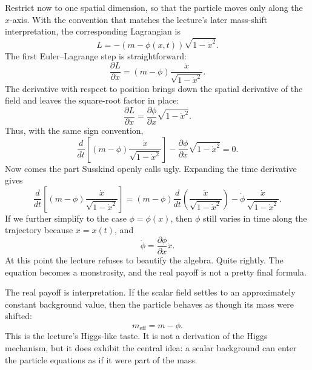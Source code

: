 Restrict now to one spatial dimension, so that the particle moves only along the \(x\)-axis. With the convention that matches the lecture's later mass-shift interpretation, the corresponding Lagrangian is
\begin{equation}
L=-(m-\phi(x,t))\sqrt{1-\dot x^2}.
\end{equation}
The first Euler--Lagrange step is straightforward:
\begin{equation}
\frac{\partial L}{\partial \dot x}
=
(m-\phi)\frac{\dot x}{\sqrt{1-\dot x^2}}.
\end{equation}
The derivative with respect to position brings down the spatial derivative of the field and leaves the square-root factor in place:
\begin{equation}
\frac{\partial L}{\partial x}
=
\frac{\partial\phi}{\partial x}\sqrt{1-\dot x^2}.
\end{equation}
Thus, with the same sign convention,
\begin{equation}
\frac{d}{dt}
\left[
(m-\phi)\frac{\dot x}{\sqrt{1-\dot x^2}}
\right]
-
\frac{\partial\phi}{\partial x}\sqrt{1-\dot x^2}
=0.
\end{equation}
Now comes the part Susskind openly calls ugly. Expanding the time derivative gives
\begin{equation}
\frac{d}{dt}
\left[
(m-\phi)\frac{\dot x}{\sqrt{1-\dot x^2}}
\right]
=
(m-\phi)\frac{d}{dt}\left(\frac{\dot x}{\sqrt{1-\dot x^2}}\right)
-
\dot\phi\,\frac{\dot x}{\sqrt{1-\dot x^2}}.
\end{equation}
If we further simplify to the case \(\phi=\phi(x)\), then \(\phi\) still varies in time along the trajectory because \(x=x(t)\), and
\begin{equation}
\dot\phi=\frac{\partial\phi}{\partial x}\dot x.
\end{equation}
At this point the lecture refuses to beautify the algebra. Quite rightly. The equation becomes a monstrosity, and the real payoff is not a pretty final formula.

The real payoff is interpretation. If the scalar field settles to an approximately constant background value, then the particle behaves as though its mass were shifted:
\begin{equation}
m_{\mathrm{eff}}=m-\phi.
\end{equation}
This is the lecture's Higgs-like taste. It is not a derivation of the Higgs mechanism, but it does exhibit the central idea: a scalar background can enter the particle equations as if it were part of the mass.

